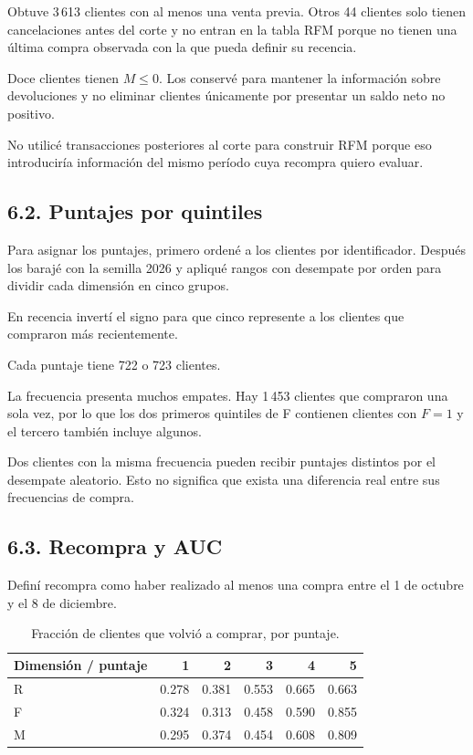 \documentclass[11pt,letterpaper]{article}
\begin{document}
Obtuve 3\,613 clientes con al menos una venta previa. Otros 44 clientes solo tienen cancelaciones antes del corte y no entran en la tabla RFM porque no tienen una última compra observada con la que pueda definir su recencia.

Doce clientes tienen $M\leq0$. Los conservé para mantener la información sobre devoluciones y no eliminar clientes únicamente por presentar un saldo neto no positivo.

No utilicé transacciones posteriores al corte para construir RFM porque eso introduciría información del mismo período cuya recompra quiero evaluar.

\subsection*{6.2. Puntajes por quintiles}

Para asignar los puntajes, primero ordené a los clientes por identificador. Después los barajé con la semilla 2026 y apliqué rangos con desempate por orden para dividir cada dimensión en cinco grupos.

En recencia invertí el signo para que cinco represente a los clientes que compraron más recientemente.

Cada puntaje tiene 722 o 723 clientes.

La frecuencia presenta muchos empates. Hay 1\,453 clientes que compraron una sola vez, por lo que los dos primeros quintiles de F contienen clientes con $F=1$ y el tercero también incluye algunos.

Dos clientes con la misma frecuencia pueden recibir puntajes distintos por el desempate aleatorio. Esto no significa que exista una diferencia real entre sus frecuencias de compra.

\subsection*{6.3. Recompra y AUC}

Definí recompra como haber realizado al menos una compra entre el 1 de octubre y el 8 de diciembre.

\begin{table}[H]
\centering
\caption{Fracción de clientes que volvió a comprar, por puntaje.}
\begin{tabular}{lrrrrr}
\toprule
Dimensión / puntaje & 1 & 2 & 3 & 4 & 5\\
\midrule
R & 0.278 & 0.381 & 0.553 & 0.665 & 0.663\\
F & 0.324 & 0.313 & 0.458 & 0.590 & 0.855\\
M & 0.295 & 0.374 & 0.454 & 0.608 & 0.809\\
\bottomrule
\end{tabular}
\end{table}
\end{document}
